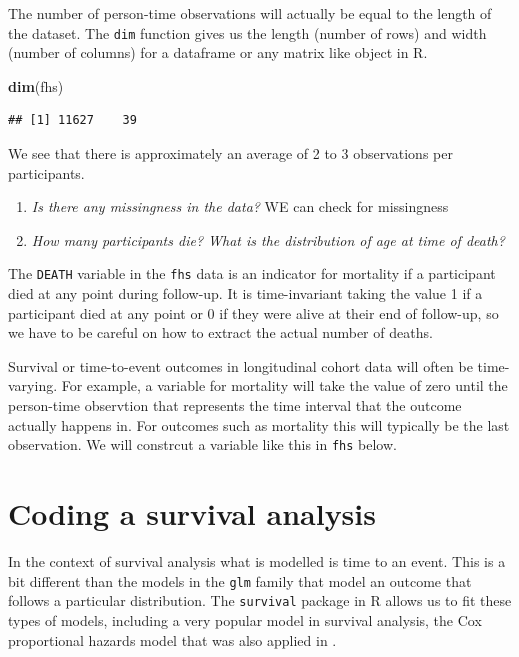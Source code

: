 \documentclass[
]{book}
\newenvironment{Shaded}{\begin{snugshade}}{\end{snugshade}}
\newcommand{\KeywordTok}[1]{\textcolor[rgb]{0.13,0.29,0.53}{\textbf{#1}}}
\newcommand{\NormalTok}[1]{#1}
\begin{document}
The number of person-time observations will actually be equal to the length of the dataset.
The \texttt{dim} function gives us the length (number of rows) and width (number of columns) for a dataframe or any matrix like object in R.

\begin{Shaded}
\begin{Highlighting}[]
\KeywordTok{dim}\NormalTok{(fhs)}
\end{Highlighting}
\end{Shaded}

\begin{verbatim}
## [1] 11627    39
\end{verbatim}

We see that there is approximately an average of 2 to 3 observations per participants.

\begin{enumerate}
\def\labelenumi{\arabic{enumi}.}
\setcounter{enumi}{1}
\item
  \emph{Is there any missingness in the data?}
  WE can check for missingness
\item
  \emph{How many participants die? What is the distribution of age at time of death?}
\end{enumerate}

The \texttt{DEATH} variable in the \texttt{fhs} data is an indicator for mortality if a participant died at any point during follow-up. It is time-invariant taking the value 1 if a participant died at any point or 0 if they were alive at their end of follow-up, so we have to be careful on how to extract the actual number of deaths.

Survival or time-to-event outcomes in longitudinal cohort data will often be time-varying. For example, a variable for mortality will take the value of zero until the person-time observtion that represents the time interval that the outcome actually happens in. For outcomes such as mortality this will typically be the last observation. We will constrcut a variable like this in \texttt{fhs} below.

\hypertarget{coding-a-survival-analysis}{%
\section{Coding a survival analysis}\label{coding-a-survival-analysis}}

In the context of survival analysis what is modelled is time to an event. This is
a bit different than the models in the \texttt{glm} family that model an outcome that follows
a particular distribution. The \texttt{survival} package in R allows us to fit these types of models, including a very popular model in survival analysis, the Cox proportional
hazards model that was also applied in \citet{wong1989risk}.
\end{document}
